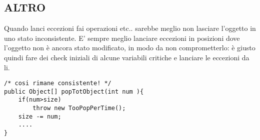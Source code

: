 \subsection{ALTRO}
\noindent Quando lanci eccezioni fai operazioni etc.. sarebbe meglio non lasciare l'oggetto in uno stato inconsistente. E' sempre meglio lanciare eccezioni in posizioni dove l'oggetto non è ancora stato modificato, in modo da non comprometterlo: è giusto quindi fare dei check iniziali di alcune variabili critiche e lanciare le eccezioni da li. 
\begin{lstlisting}
/* cosi rimane consistente! */
public Object[] popTotObject(int num ){
	if(num>size)
		throw new TooPopPerTime();
	size -= num;
	....
}
\end{lstlisting}